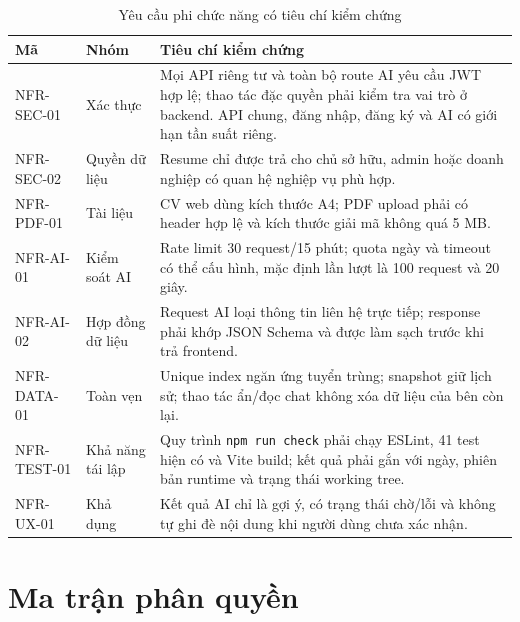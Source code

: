\begin{table}[H]
    \centering
    \small
    \begin{tabularx}{\textwidth}{|p{}|p{}|Y|} \hline
        \textbf{Mã} & \textbf{Nhóm} & \textbf{Tiêu chí kiểm chứng} \\ \hline
        NFR-SEC-01 & Xác thực & Mọi API riêng tư và toàn bộ route AI yêu cầu JWT hợp lệ; thao tác đặc quyền phải kiểm tra vai trò ở backend. API chung, đăng nhập, đăng ký và AI có giới hạn tần suất riêng. \\ \hline
        NFR-SEC-02 & Quyền dữ liệu & Resume chỉ được trả cho chủ sở hữu, admin hoặc doanh nghiệp có quan hệ nghiệp vụ phù hợp. \\ \hline
        NFR-PDF-01 & Tài liệu & CV web dùng kích thước A4; PDF upload phải có header hợp lệ và kích thước giải mã không quá 5 MB. \\ \hline
        NFR-AI-01 & Kiểm soát AI & Rate limit 30 request/15 phút; quota ngày và timeout có thể cấu hình, mặc định lần lượt là 100 request và 20 giây. \\ \hline
        NFR-AI-02 & Hợp đồng dữ liệu & Request AI loại thông tin liên hệ trực tiếp; response phải khớp JSON Schema và được làm sạch trước khi trả frontend. \\ \hline
        NFR-DATA-01 & Toàn vẹn & Unique index ngăn ứng tuyển trùng; snapshot giữ lịch sử; thao tác ẩn/đọc chat không xóa dữ liệu của bên còn lại. \\ \hline
        NFR-TEST-01 & Khả năng tái lập & Quy trình \texttt{npm run check} phải chạy ESLint, 41 test hiện có và Vite build; kết quả phải gắn với ngày, phiên bản runtime và trạng thái working tree. \\ \hline
        NFR-UX-01 & Khả dụng & Kết quả AI chỉ là gợi ý, có trạng thái chờ/lỗi và không tự ghi đè nội dung khi người dùng chưa xác nhận. \\ \hline
    \end{tabularx}
    \caption{Yêu cầu phi chức năng có tiêu chí kiểm chứng}
    \label{tab:nonfunctional-requirements}
\end{table}

\section{Ma trận phân quyền}

